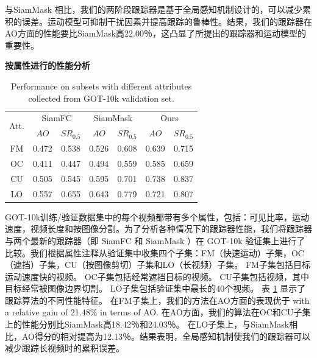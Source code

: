 与SiamMask \cite{Wang2018SiamMask}相比，我们的两阶段跟踪器是基于全局感知机制设计的，可以减少累积的误差。运动模型可抑制干扰因素并提高跟踪的鲁棒性。结果，我们的跟踪器在AO方面的性能要比SiamMask高22.00％，这凸显了所提出的跟踪器和运动模型的重要性。

\textbf{按属性进行的性能分析} 
\begin{table}
\centering
\caption{Performance on subsets with different attributes collected from GOT-10k validation set.}
\begin{tabular}{|c|c|c|c|c|c|c|}
\hline
\multirow{2}{*}{Att.} &
\multicolumn{2}{c|}{SiamFC} & \multicolumn{2}{c|}{SiamMask} &\multicolumn{2}{c|}{Ours} \\
\cline{2-7} & $AO$ & $SR_{0.5}$ & $AO$ & $SR_{0.5}$ & $AO$ & $SR_{0.5}$ \\
\hline
FM & 0.472 & 0.538 & 0.526 & 0.608 & 0.639 & 0.715 \\
\hline
OC & 0.411 & 0.447 & 0.494 & 0.559 & 0.585 & 0.659 \\
\hline
CU & 0.505 & 0.545 & 0.595 & 0.701 & 0.738 & 0.837 \\
\hline
LO & 0.557 & 0.655 & 0.643 & 0.779 & 0.721 & 0.807 \\
\hline
\end{tabular}
\label{table:attribute}
\end{table}
GOT-10k训练/验证数据集中的每个视频都带有多个属性，包括：可见比率，运动速度，视频长度和按图像分割。为了分析各种情况下的跟踪器性能，我们将跟踪器与两个最新的跟踪器（即 SiamFC  \cite{SiamFC} 和 SiamMask \cite{Wang2018SiamMask}）在 GOT-10k 验证集上进行了比较。我们根据属性注释从验证集中收集四个子集：FM（快速运动）子集，OC（遮挡）子集，CU（按图像剪切）子集和LO（长视频）子集。
FM子集包括目标运动速度快的视频。
OC子集包括经常遮挡目标的视频。
CU子集包括视频，其中目标经常被图像边界切割。
LO子集包括验证集中最长的40个视频。
表 \ref{table:attribute} 显示了跟踪算法的不同性能特征。
在FM子集上，我们的方法在AO方面的表现优于 \cite{Wang2018SiamMask} with a relative gain of 21.48\% in terms of AO. 
在AO方面，我们的算法在OC和CU子集上的性能分别比SiamMask高18.42％和24.03％。
在LO子集上，与SiamMask相比，AO得分的相对提高为12.13％。结果表明，全局感知机制使我们的跟踪器可以减少跟踪长视频时的累积误差。


